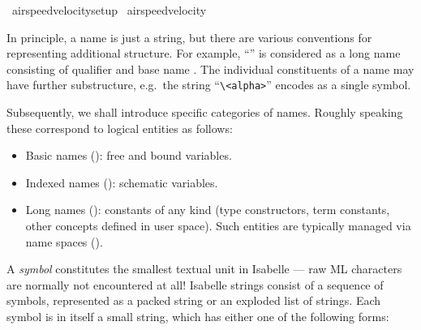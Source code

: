\begin{isabellebody}
{\isacharverbatimclose}\isanewline
{}\isamarkupfalse%
\ airspeed{\isacharunderscore}velocity{\isacharunderscore}setup%
\endisatagML
{\isafoldML}%
%
\isadelimML
%
\endisadelimML
\isanewline
\isanewline
{}\isamarkupfalse%
\ {\isacharbrackleft}{\isacharbrackleft}airspeed{\isacharunderscore}velocity\ {\isacharequal}\ {}{\isachardot}{}{\isacharbrackright}{\isacharbrackright}%
\isamarkuptrue%
%
\begin{isamarkuptext}%
In principle, a name is just a string, but there are various
  conventions for representing additional structure.  For example,
  ``'' is considered as a long name consisting of
  qualifier  and base name .  The
  individual constituents of a name may have further substructure,
  e.g.\ the string ``\verb,\,\verb,<alpha>,'' encodes as a single
  symbol.

  \medskip Subsequently, we shall introduce specific categories of
  names.  Roughly speaking these correspond to logical entities as
  follows:
  \begin{itemize}

  \item Basic names (): free and bound
  variables.

  \item Indexed names (): schematic variables.

  \item Long names (): constants of any kind
  (type constructors, term constants, other concepts defined in user
  space).  Such entities are typically managed via name spaces
  ().

  \end{itemize}%
\end{isamarkuptext}%
\isamarkuptrue%
%
\isamarkuptrue%
%
\begin{isamarkuptext}%
A \emph{symbol} constitutes the smallest textual unit in
  Isabelle --- raw ML characters are normally not encountered at all!
  Isabelle strings consist of a sequence of symbols, represented as a
  packed string or an exploded list of strings.  Each symbol is in
  itself a small string, which has either one of the following forms:

  \begin{enumerate}


\end{enumerate}
\end{isamarkuptext}
\end{isabellebody}
